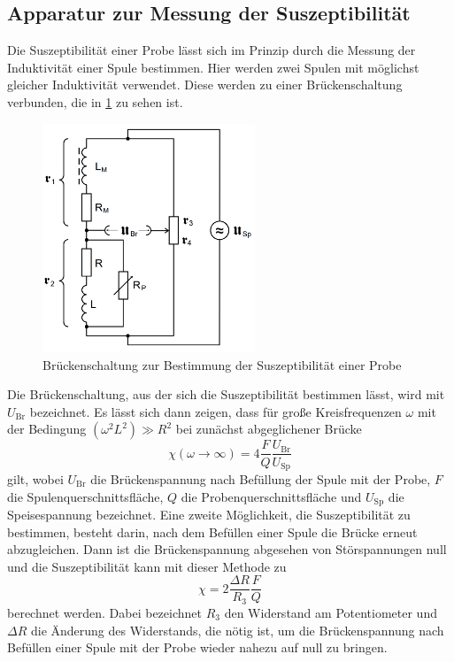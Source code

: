 \subsection{Apparatur zur Messung der Suszeptibilität}
\label{subsec:apparatur}

Die Suszeptibilität einer Probe lässt sich im Prinzip durch die Messung
der Induktivität einer Spule bestimmen. Hier werden zwei Spulen mit möglichst gleicher
Induktivität verwendet. Diese werden zu einer Brückenschaltung verbunden, die in \ref{fig:brueckenschaltung} zu sehen ist.

\begin{figure}[H]
  \centering
  \includegraphics[width=180pt]{data/bruecke.png}
  \caption{Brückenschaltung zur Bestimmung der Suszeptibilität einer Probe\cite{Versuchsanleitung}}
  \label{fig:brueckenschaltung}
\end{figure}

Die Brückenschaltung, aus der sich die Suszeptibilität bestimmen lässt, wird mit $U_\text{Br}$ bezeichnet.
Es lässt sich dann zeigen, dass für große Kreisfrequenzen $\omega$ mit der Bedingung
$(\omega^2 L ^2) \gg R^2$ bei zunächst abgeglichener Brücke
\begin{equation}
  \chi(\omega \to \infty) = 4 \frac{F}{Q} \frac{U_\text{Br}}{U_\text{Sp}}
\end{equation}
gilt, wobei $U_\text{Br}$ die Brückenspannung nach Befüllung der Spule mit der Probe,
$F$ die Spulenquerschnittsfläche, $Q$ die Probenquerschnittsfläche und $U_\text{Sp}$ die Speisespannung bezeichnet.
Eine zweite Möglichkeit, die Suszeptibilität zu bestimmen, besteht darin, nach dem Befüllen
einer Spule die Brücke erneut abzugleichen. Dann ist die Brückenspannung abgesehen von Störspannungen
null und die Suszeptibilität kann mit dieser Methode zu
\begin{equation}
  \chi = 2 \frac{\Delta R}{R_3} \frac{F}{Q}
\end{equation}
berechnet werden. Dabei bezeichnet $R_3$ den Widerstand am Potentiometer und $\Delta R$
die Änderung des Widerstands, die nötig ist, um die Brückenspannung nach Befüllen
einer Spule mit der Probe wieder nahezu auf null zu bringen.

